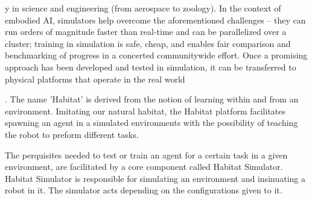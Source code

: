 \documentclass[11pt, a4paper]{article}
\begin{document}
y in science and
engineering (from aerospace to zoology). In the context of
embodied AI, simulators help overcome the aforementioned
challenges – they can run orders of magnitude faster than
real-time and can be parallelized over a cluster; training
in simulation is safe, cheap, and enables fair comparison
and benchmarking of progress in a concerted communitywide effort. Once a promising approach has been developed
and tested in simulation, it can be transferred to physical
platforms that operate in the real world

. The name 'Habitat' is derived from  the notion of learning within and from an environment. Imitating our natural habitat, the Habitat platform facilitates spawning an agent in a simulated environments with the possibility of teaching the robot to preform different tasks. 

The perquisites needed to test or train an agent for a certain task in a given environment, are facilitated by a core component called  Habitat Simulator. Habitat Simulator is responsible for simulating an  environment and insinuating a robot in it. The simulator acts depending on the configurations given to it. 
\end{document}
